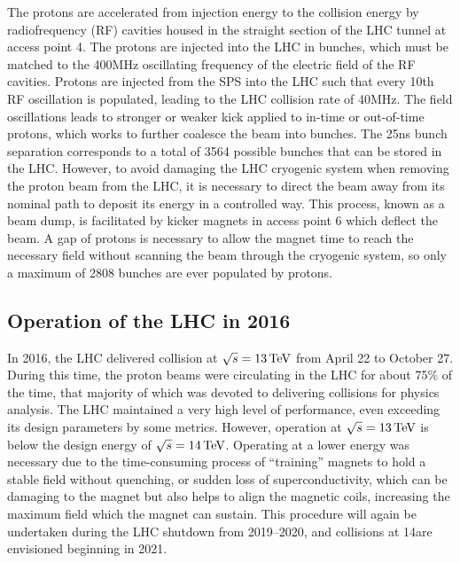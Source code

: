 The protons are accelerated from injection energy to the collision energy by 
radiofrequency (RF) cavities housed in the straight section of the LHC tunnel at access point 4.
The protons are injected into the LHC in bunches, which must be matched to the 
400\unit{MHz} oscillating frequency of the electric field of the RF cavities. 
Protons are injected from the SPS into the LHC such that every 10th RF oscillation 
is populated, leading to the LHC collision rate of 40\unit{MHz}. 
The field oscillations leads to stronger or weaker kick applied to in-time or out-of-time protons,
which works to further coalesce the beam into bunches.
The 25\unit{ns} bunch separation corresponds to a total of 3564 possible bunches
that can be stored in the LHC. However, 
to avoid damaging the LHC cryogenic system when removing the proton beam from the LHC,
it is necessary to direct the beam
away from its nominal path to deposit its energy in a controlled way.
This process, known as a beam dump,
is facilitated by kicker magnets in access point 6 which deflect the beam. A gap
of protons is necessary to allow the magnet time to reach the necessary field without
scanning the beam through the cryogenic system, so only a maximum of 2808 bunches 
are ever populated by protons.

\subsection{Operation of the LHC in 2016}

In 2016, the LHC delivered \pp collision at $\sqrt{s} = 13\,\text{Te\hspace{-.08em}V}$ from
April 22 to October 27. During this time, the proton beams were circulating in the
LHC for about 75\% of the time, that majority of which was devoted to
delivering collisions for physics analysis.
The LHC maintained a very high level of
performance, even exceeding its design parameters by some metrics. 
However, operation at $\sqrt{s} = 13\,\text{Te\hspace{-.08em}V}$ is below the design energy of $\sqrt{s}=14\,\text{Te\hspace{-.08em}V}$.
Operating at a lower energy was necessary due to the time-consuming process of 
``training'' magnets to hold a stable field without quenching, or sudden loss
of superconductivity, which can be damaging to the magnet but also helps to align 
the magnetic coils, increasing the maximum field which the magnet can sustain.
This procedure will again be undertaken during the LHC shutdown from 2019--2020, and
collisions at 14\TeV are envisioned beginning in 2021.

